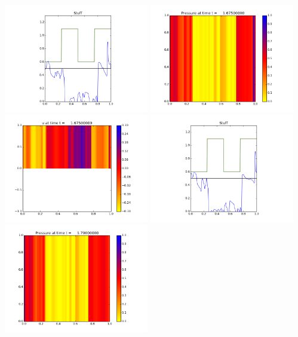 \documentclass[11pt]{article}
\begin{document}
\vskip 10pt 
\includegraphics[width=0.475\textwidth]{frame0066fig3.png}
\vskip 10pt 
\includegraphics[width=0.475\textwidth]{frame0067fig0.png}
\includegraphics[width=0.475\textwidth]{frame0067fig1.png}
\vskip 10pt 
\includegraphics[width=0.475\textwidth]{frame0067fig3.png}
\vskip 10pt 
\includegraphics[width=0.475\textwidth]{frame0068fig0.png}
\end{document}
